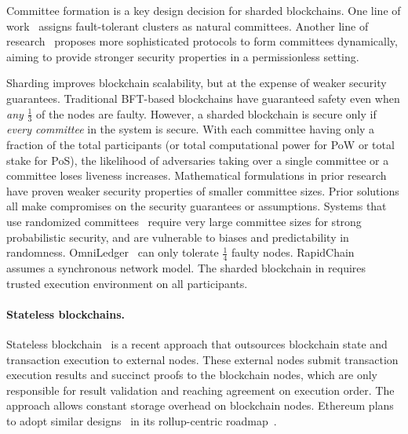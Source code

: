 Committee formation is a key design decision for sharded blockchains.
One line of work~\cite{ruan2021blockchains,el2019blockchaindb,hong2024gridb,amiri2021sharper,hellings2021byshard} assigns fault-tolerant clusters as natural committees.
Another line of research~\cite{kokoris2018omniledger,dang2019towards,zamani2018rapidchain} proposes more sophisticated protocols to form committees dynamically, aiming to provide stronger security properties in a permissionless setting.

Sharding improves blockchain scalability, but at the expense of weaker security guarantees.
Traditional BFT-based blockchains have guaranteed safety even when \emph{any} $\frac{1}{3}$ of the nodes are faulty.
However, a sharded blockchain is secure only if \emph{every committee} in the system is secure.
With each committee having only a fraction of the total participants (or total computational power for PoW or total stake for PoS), the likelihood of adversaries taking over a single committee or a committee loses liveness increases.
Mathematical formulations in prior research~\cite{shard-model,shard-sybil} have proven weaker security properties of smaller committee sizes.
Prior solutions all make compromises on the security guarantees or assumptions.
Systems that use randomized committees~\cite{kokoris2018omniledger,dang2019towards,zamani2018rapidchain,algorand} require very large committee sizes for strong probabilistic security, and are vulnerable to biases and predictability in randomness.
OmniLedger~\cite{kokoris2018omniledger} can only tolerate $\frac{1}{4}$ faulty nodes.
RapidChain~\cite{zamani2018rapidchain} assumes a synchronous network model.
The sharded blockchain in \cite{dang2019towards} requires trusted execution environment on all participants.

\paragraph{Stateless blockchains.}
Stateless blockchain~\cite{xu2021slimchain,boneh2019batching,chepurnoy2018edrax,tomescu2020aggregatable,xu2022l2chain,lee2020replicated} is a recent approach that outsources blockchain state and transaction execution to external nodes.
These external nodes submit transaction execution results and succinct proofs to the blockchain nodes, which are only responsible for result validation and reaching agreement on execution order.
The approach allows constant storage overhead on blockchain nodes.
Ethereum plans to adopt similar designs~\cite{eip4844} in its rollup-centric roadmap~\cite{ethereum_scaling_docs,vbuterin2020rolluproadmap}.

